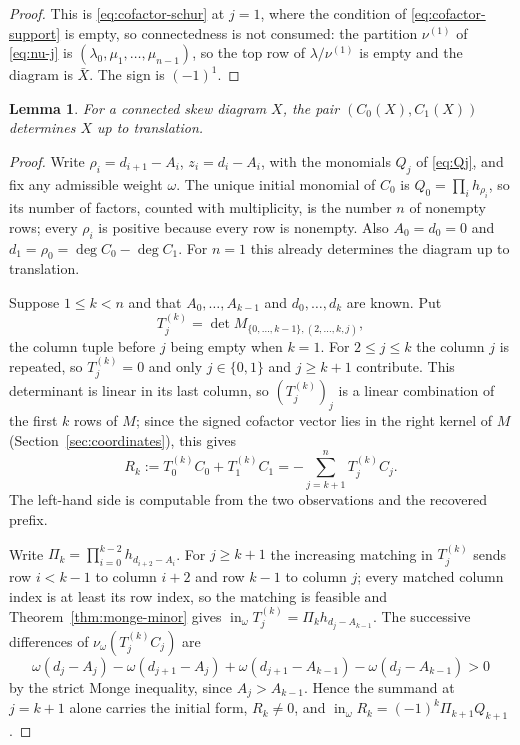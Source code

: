 \documentclass[11pt,a4paper]{amsart}
\numberwithin{equation}{section}
\theoremstyle{plain}
\newtheorem{lemma}[theorem]{Lemma}
\theoremstyle{definition}
\newcommand{\wto}{\nu_{\omega}}
\newcommand{\inin}{\operatorname{in}}
\begin{document}
\begin{proof}
This is \eqref{eq:cofactor-schur} at \(j=1\), where the condition of \eqref{eq:cofactor-support} is empty, so connectedness is not consumed: the partition \(\nu^{(1)}\) of \eqref{eq:nu-j} is \((\lambda_0,\mu_1,\ldots,\mu_{n-1})\), so the top row of \(\lambda/\nu^{(1)}\) is empty and the diagram is \(\bar X\).  The sign is \((-1)^1\).
\end{proof}

\begin{lemma}\label{lem:two-cofactor-reconstruction}
For a connected skew diagram \(X\), the pair \((C_0(X),C_1(X))\) determines \(X\) up to translation.
\end{lemma}

\begin{proof}
Write \(\rho_i=d_{i+1}-A_i\), \(z_i=d_i-A_i\), with the monomials \(Q_j\) of \eqref{eq:Qj}, and fix any admissible weight \(\omega\).  The unique initial monomial of \(C_0\) is \(Q_0=\prod_ih_{\rho_i}\), so its number of factors, counted with multiplicity, is the number \(n\) of nonempty rows; every \(\rho_i\) is positive because every row is nonempty.  Also \(A_0=d_0=0\) and \(d_1=\rho_0=\deg C_0-\deg C_1\).  For \(n=1\) this already determines the diagram up to translation.

Suppose \(1\le k<n\) and that \(A_0,\ldots,A_{k-1}\) and \(d_0,\ldots,d_k\) are known.  Put
\[
T_j^{(k)}=\det M_{\{0,\ldots,k-1\},(2,\ldots,k,j)},
\]
the column tuple before \(j\) being empty when \(k=1\).  For \(2\le j\le k\) the column \(j\) is repeated, so \(T_j^{(k)}=0\) and only \(j\in\{0,1\}\) and \(j\ge k+1\) contribute.  This determinant is linear in its last column, so \((T_j^{(k)})_j\) is a linear combination of the first \(k\) rows of \(M\); since the signed cofactor vector lies in the right kernel of \(M\) (Section~\ref{sec:coordinates}), this gives
\[
R_k:=T_0^{(k)}C_0+T_1^{(k)}C_1=-\sum_{j=k+1}^{n}T_j^{(k)}C_j .
\]
The left-hand side is computable from the two observations and the recovered prefix.

Write \(\Pi_k=\prod_{i=0}^{k-2}h_{d_{i+2}-A_i}\).  For \(j\ge k+1\) the increasing matching in \(T_j^{(k)}\) sends row \(i<k-1\) to column \(i+2\) and row \(k-1\) to column \(j\); every matched column index is at least its row index, so the matching is feasible and Theorem~\ref{thm:monge-minor} gives \(\inin_\omega T_j^{(k)}=\Pi_kh_{d_j-A_{k-1}}\).  The successive differences of \(\wto(T_j^{(k)}C_j)\) are
\[
\omega(d_j-A_j)-\omega(d_{j+1}-A_j)+\omega(d_{j+1}-A_{k-1})-\omega(d_j-A_{k-1})>0
\]
by the strict Monge inequality, since \(A_j>A_{k-1}\).  Hence the summand at \(j=k+1\) alone carries the initial form, \(R_k\ne0\), and \(\inin_\omega R_k=(-1)^k\Pi_{k+1}Q_{k+1}\).


\end{proof}
\end{document}
